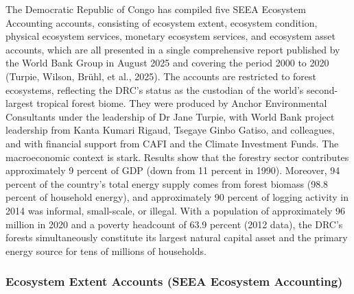 \documentclass[
  letterpaper,
  DIV=11,
  numbers=noendperiod]{scrartcl}
\begin{document}
The Democratic Republic of Congo has compiled five SEEA Ecosystem
Accounting accounts, consisting of ecosystem extent, ecosystem
condition, physical ecosystem services, monetary ecosystem services, and
ecosystem asset accounts, which are all presented in a single
comprehensive report published by the World Bank Group in August 2025
and covering the period 2000 to 2020 (Turpie, Wilson, Brühl, et al.,
2025). The accounts are restricted to forest ecosystems, reflecting the
DRC's status as the custodian of the world's second-largest tropical
forest biome. They were produced by Anchor Environmental Consultants
under the leadership of Dr Jane Turpie, with World Bank project
leadership from Kanta Kumari Rigaud, Tsegaye Ginbo Gatiso, and
colleagues, and with financial support from CAFI and the Climate
Investment Funds. The macroeconomic context is stark. Results show that
the forestry sector contributes approximately 9 percent of GDP (down
from 11 percent in 1990). Moreover, 94 percent of the country's total
energy supply comes from forest biomass (98.8 percent of household
energy), and approximately 90 percent of logging activity in 2014 was
informal, small-scale, or illegal. With a population of approximately 96
million in 2020 and a poverty headcount of 63.9 percent (2012 data), the
DRC's forests simultaneously constitute its largest natural capital
asset and the primary energy source for tens of millions of households.

\subsubsection{Ecosystem Extent Accounts (SEEA Ecosystem
Accounting)}\label{ecosystem-extent-accounts-seea-ecosystem-accounting}
\end{document}
